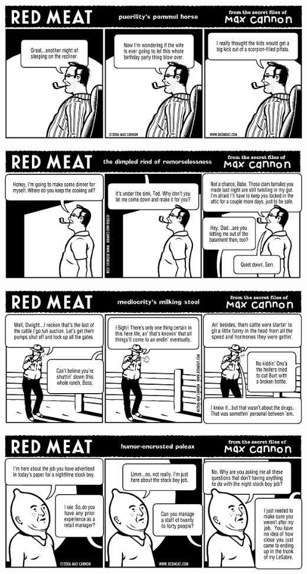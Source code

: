 \documentclass[a4paper,twoside,11pt]{article}
\begin{document}
\includegraphics[width=\textwidth]{redmeat_2006-10-24.png}



\includegraphics[width=\textwidth]{redmeat_2006-10-31.png}



\includegraphics[width=\textwidth]{redmeat_2006-11-07.png}



\includegraphics[width=\textwidth]{redmeat_2006-11-14.png}
\end{document}
